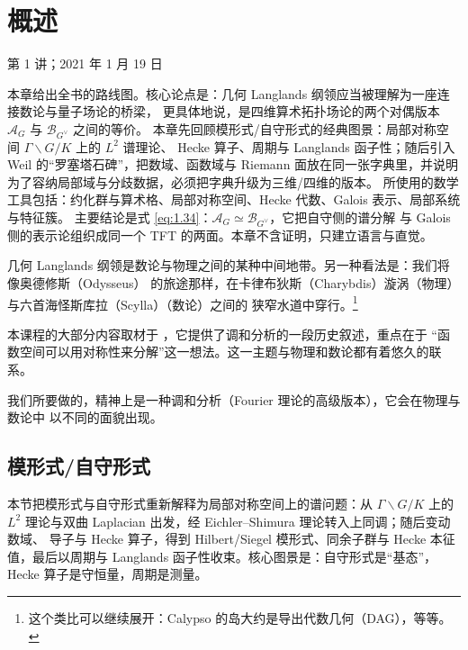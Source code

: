 \chapter{概述}\label{ch:01}

\begin{flushright}
\small 第 1 讲；2021 年 1 月 19 日
\end{flushright}

\begin{keytakeaways}
本章给出全书的路线图。核心论点是：几何 Langlands 纲领应当被理解为一座连接数论与量子场论的桥梁，
更具体地说，是四维算术拓扑场论的两个对偶版本 $\mathcal{A}_G$ 与 $\mathcal{B}_{G^{\vee}}$ 之间的等价。
本章先回顾模形式/自守形式的经典图景：局部对称空间 $\Gamma\backslash G/K$ 上的 $L^2$ 谱理论、
Hecke 算子、周期与 Langlands 函子性；随后引入 Weil 的“罗塞塔石碑”，把数域、函数域与
Riemann 面放在同一张字典里，并说明为了容纳局部域与分歧数据，必须把字典升级为三维/四维的版本。
所使用的数学工具包括：约化群与算术格、局部对称空间、Hecke 代数、Galois 表示、局部系统与特征簇。
主要结论是式 \eqref{eq:1.34}：$\mathcal{A}_G\simeq\mathcal{B}_{G^{\vee}}$，它把自守侧的谱分解
与 Galois 侧的表示论组织成同一个 TFT 的两面。本章不含证明，只建立语言与直觉。
\end{keytakeaways}

几何 Langlands 纲领是数论与物理之间的某种中间地带。另一种看法是：我们将像奥德修斯（Odysseus）
的旅途那样，在卡律布狄斯（Charybdis）漩涡（物理）与六首海怪斯库拉（Scylla）（数论）之间的
狭窄水道中穿行。\footnote{这个类比可以继续展开：Calypso 的岛大约是导出代数几何（DAG），等等。}

本课程的大部分内容取材于 \cite{Mac78}，它提供了调和分析的一段历史叙述，重点在于
“函数空间可以用对称性来分解”这一想法。这一主题与物理和数论都有着悠久的联系。

我们所要做的，精神上是一种调和分析（Fourier 理论的高级版本），它会在物理与数论中
以不同的面貌出现。

\section{模形式/自守形式}
\begin{sectionkey}
本节把模形式与自守形式重新解释为局部对称空间上的谱问题：从 $\Gamma\backslash G/K$ 上的
$L^2$ 理论与双曲 Laplacian 出发，经 Eichler--Shimura 理论转入上同调；随后变动数域、
导子与 Hecke 算子，得到 Hilbert/Siegel 模形式、同余子群与 Hecke 本征值，最后以周期与
Langlands 函子性收束。核心图景是：自守形式是“基态”，Hecke 算子是守恒量，周期是测量。
\end{sectionkey}

